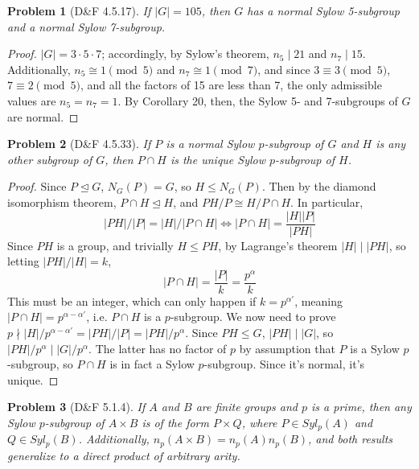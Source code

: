 \documentclass{article}
\newcommand{\nsub}{\trianglelefteq}
\newtheorem{problem}{Problem}
\begin{document}
\begin{problem}[D\&F 4.5.17]
  If $|G| = 105$, then $G$ has a normal Sylow 5-subgroup and a normal Sylow 7-subgroup.
\end{problem}

\begin{proof}
  $|G| = 3 \cdot 5 \cdot 7$; accordingly, by Sylow's theorem, $n_{5} \mid 21$ and $n_{7} \mid 15$.
  Additionally, $n_{5} \cong 1 \pmod 5$ and $n_{7} \cong 1 \pmod 7$, and since $3 \equiv 3 \pmod 5$, $7 \equiv 2 \pmod 5$,
  and all the factors of 15 are less than 7, the only admissible values are $n_{5} = n_{7} = 1$.
  By Corollary 20, then, the Sylow 5- and 7-subgroups of $G$ are normal.
\end{proof}

\begin{problem}[D\&F 4.5.33]
  If $P$ is a normal Sylow $p$-subgroup of $G$ and $H$ is any other subgroup of $G$, then $P \cap H$ is the unique Sylow $p$-subgroup of $H$.
\end{problem}

\begin{proof}
  Since $P \nsub G$, $N_{G}(P) = G$, so $H \leq N_{G}(P)$.
  Then by the diamond isomorphism theorem, $P\cap H \nsub H$, and $PH / P \cong H / P \cap H$.
  In particular,
  \[
    |PH| / |P| = |H| / |P \cap H| \Leftrightarrow |P \cap H| = \frac{|H||P|}{|PH|}
  \]
  Since $PH$ is a group, and trivially $H \leq PH$, by Lagrange's theorem $|H| \mid |PH|$, so letting $|PH| / |H| = k$,
  \[
    |P \cap H| = \frac{|P|}{k} = \frac{p^{\alpha}}{k}
  \]
  This must be an integer, which can only happen if $k = p^{\alpha'}$, meaning $|P \cap H| = p^{\alpha - \alpha'}$, i.e. $P \cap H$ is a $p$-subgroup.
  We now need to prove $p \nmid |H| / p^{\alpha - \alpha'} = |PH| / |P| = |PH| / p^{\alpha}$.
  Since $PH \leq G$, $|PH| \mid |G|$, so $|PH| / p^{\alpha} \mid |G| / p^{\alpha}$.
  The latter has no factor of $p$ by assumption that $P$ is a Sylow $p$-subgroup, so $P \cap H$ is in fact a Sylow $p$-subgroup.
  Since it's normal, it's unique.
\end{proof}

\begin{problem}[D\&F 5.1.4]
  If $A$ and $B$ are finite groups and $p$ is a prime, then any Sylow $p$-subgroup of $A \times B$ is of the form $P \times Q$,
  where $P \in Syl_{p}(A)$ and $Q \in Syl_{p}(B)$.
  Additionally, $n_{p}(A \times B) = n_{p}(A)n_{p}(B)$, and both results generalize to a direct product of arbitrary arity.
\end{problem}
\end{document}
